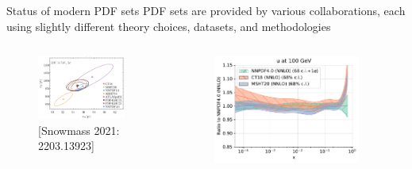 \documentclass[aspectratio=169, 8pt,t]{beamer}
\begin{document}
\begin{frame}{Status of modern PDF sets}
  PDF sets are provided by various collaborations, each using slightly different theory choices, datasets, and methodologies
  \begin{columns}
    \begin{column}{0.33\textwidth}
      \begin{figure}
        \includegraphics[width=0.9\textwidth]{figures/Httbar_xsec.png}
        \caption*{\color{gray}\small \footnotesize [Snowmass 2021: 2203.13923]}
      \end{figure}
    \end{column}
    \begin{column}{0.33\textwidth}
      \begin{figure}
        \includegraphics[width=0.9\textwidth]{figures/pdfs_40vsothers_first_plot_pdfs_u.pdf}
      \end{figure}

\end{column}
\end{columns}
\end{frame}
\end{document}
